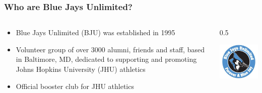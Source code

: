 \documentclass[compress,handout,10pt]{beamer}
\let\olditem\item
\renewcommand{\item}{\setlength{\itemsep}{0.5\baselineskip}\olditem}
\begin{document}
\begin{frame}
    \frametitle{Who are Blue Jays Unlimited?}
    \begin {columns}
    	\begin{column}{0.5\textwidth}
    		\begin {itemize}
    			\item Blue Jays Unlimited (BJU) was established in 1995
    			\item Volunteer group of over 3000 alumni, friends and staff, based in Baltimore, MD, dedicated to supporting and promoting Johns Hopkins University (JHU) athletics
    			\item Official booster club for JHU athletics
    		\end {itemize}
    	\end {column}
    	\begin {column}{0.5\textwidth}
    		\begin{center}
    			\includegraphics [width=2in] {BJU.jpg}
    		\end{center}
    	\end {column}
    \end{columns}
\end{frame}
\end{document}
